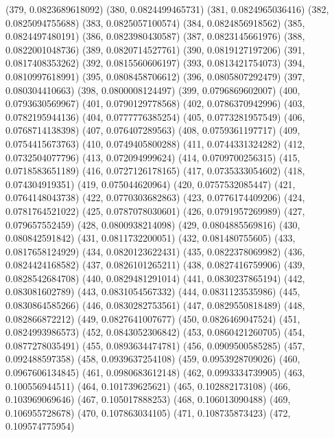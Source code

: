 {					(379, 0.0823689618092)
					(380, 0.0824499465731)
					(381, 0.0824965036416)
					(382, 0.0825094755688)
					(383, 0.0825057100574)
					(384, 0.0824856918562)
					(385, 0.0824497480191)
					(386, 0.0823980430587)
					(387, 0.0823145661976)
					(388, 0.0822001048736)
					(389, 0.0820714527761)
					(390, 0.0819127197206)
					(391, 0.0817408353262)
					(392, 0.0815560606197)
					(393, 0.0813421754073)
					(394, 0.0810997618991)
					(395, 0.0808458706612)
					(396, 0.0805807292479)
					(397, 0.080304410663)
					(398, 0.0800008124497)
					(399, 0.0796869602007)
					(400, 0.0793630569967)
					(401, 0.0790129778568)
					(402, 0.0786370942996)
					(403, 0.0782195944136)
					(404, 0.0777776385254)
					(405, 0.0773281957549)
					(406, 0.0768714138398)
					(407, 0.076407289563)
					(408, 0.0759361197717)
					(409, 0.0754415673763)
					(410, 0.0749405800288)
					(411, 0.0744331324282)
					(412, 0.0732504077796)
					(413, 0.072094999624)
					(414, 0.0709700256315)
					(415, 0.0718583651189)
					(416, 0.0727126178165)
					(417, 0.0735333054602)
					(418, 0.074304919351)
					(419, 0.075044620964)
					(420, 0.0757532085447)
					(421, 0.0764148043738)
					(422, 0.0770303682863)
					(423, 0.0776174409206)
					(424, 0.0781764521022)
					(425, 0.0787078030601)
					(426, 0.0791957269989)
					(427, 0.079657552459)
					(428, 0.0800938214098)
					(429, 0.0804885569816)
					(430, 0.080842591842)
					(431, 0.0811732200051)
					(432, 0.081480755605)
					(433, 0.0817658124929)
					(434, 0.0820123622431)
					(435, 0.0822378069982)
					(436, 0.0824424168582)
					(437, 0.0826101265211)
					(438, 0.0827416759906)
					(439, 0.0828542684708)
					(440, 0.0829481291014)
					(441, 0.0830237865194)
					(442, 0.083081602789)
					(443, 0.0831054567332)
					(444, 0.0831123535986)
					(445, 0.0830864585266)
					(446, 0.0830282753561)
					(447, 0.0829550818489)
					(448, 0.082866872212)
					(449, 0.0827641007677)
					(450, 0.0826469047524)
					(451, 0.0824993986573)
					(452, 0.0843052306842)
					(453, 0.0860421260705)
					(454, 0.0877278035491)
					(455, 0.0893634474781)
					(456, 0.0909500585285)
					(457, 0.092488597358)
					(458, 0.0939637254108)
					(459, 0.0953928709026)
					(460, 0.0967606134845)
					(461, 0.0980683612148)
					(462, 0.0993334739905)
					(463, 0.100556944511)
					(464, 0.101739625621)
					(465, 0.102882173108)
					(466, 0.103969069646)
					(467, 0.105017888253)
					(468, 0.106013090488)
					(469, 0.106955728678)
					(470, 0.107863034105)
					(471, 0.108735873423)
					(472, 0.109574775954)
}
